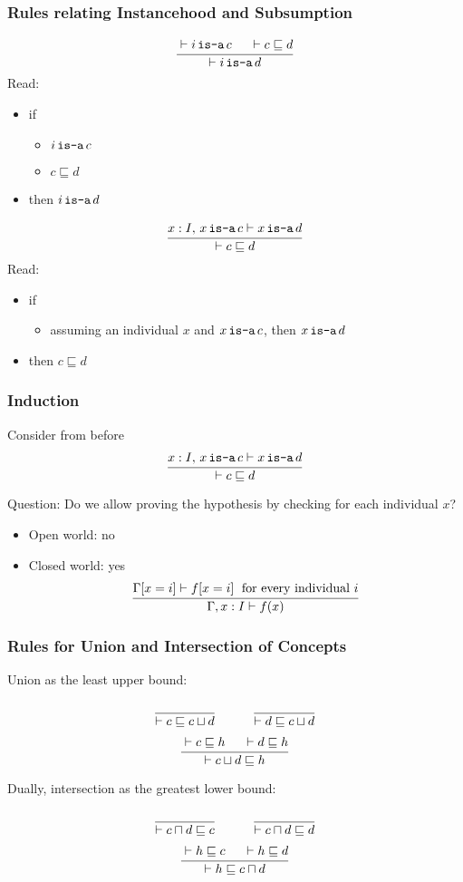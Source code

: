 \begin{frame}\frametitle{Rules relating Instancehood and Subsumption}
\[\cfrac{\vdash i\mathop{\texttt{is-a}} c \hspace*{.5cm} \vdash c\sqsubseteq d}{\vdash i\mathop{\texttt{is-a}} d}\,\]
Read:
\begin{itemize}
\item if
 \begin{itemize}
 \item $i\mathop{\texttt{is-a}} c$
 \item $c\sqsubseteq d$
 \end{itemize}
\item then $i\mathop{\texttt{is-a}} d$
\end{itemize}

\[\cfrac{x:I,\,x\mathop{\texttt{is-a}} c\vdash x\mathop{\texttt{is-a}} d}{\vdash c\sqsubseteq d}\,\]
Read:
\begin{itemize}
\item if
 \begin{itemize}
 \item assuming an individual $x$ and $x\mathop{\texttt{is-a}} c$, then $x\mathop{\texttt{is-a}} d$
 \end{itemize}
\item then $c\sqsubseteq d$
\end{itemize}
\end{frame}

\begin{frame}\frametitle{Induction}
Consider from before
\[\cfrac{x:I,\,x\mathop{\texttt{is-a}} c\vdash x\mathop{\texttt{is-a}} d}{\vdash c\sqsubseteq d}\,\]

Question: Do we allow proving the hypothesis by checking for each individual $x$?
\begin{itemize}
\item<2-> Open world: no
\item<3-> Closed world: yes
 \[\cfrac{\Gamma[x=i]\vdash f[x=i] \;\text{ for every individual } i}{\Gamma, x:I\vdash f(x)}\,\]
\end{itemize}
\end{frame}

\begin{frame}\frametitle{Rules for Union and Intersection of Concepts}
Union as the least upper bound:
\[\rul{}{\vdash c\sqsubseteq c\sqcup d} \tb\tb \rul{}{\vdash d\sqsubseteq c\sqcup d }\]
\[\cfrac{\vdash c\sqsubseteq h \hspace*{.5cm} \vdash d\sqsubseteq h}{\vdash c\sqcup d \sqsubseteq h}\,\]
\medskip

Dually, intersection as the greatest lower bound:
\[\rul{}{\vdash c\sqcap d\sqsubseteq c} \tb\tb \rul{}{\vdash c\sqcap d\sqsubseteq d}\]
\[\cfrac{\vdash h\sqsubseteq c \hspace*{.5cm} \vdash h\sqsubseteq d}{\vdash h \sqsubseteq c\sqcap d}\,\]
\end{frame}


